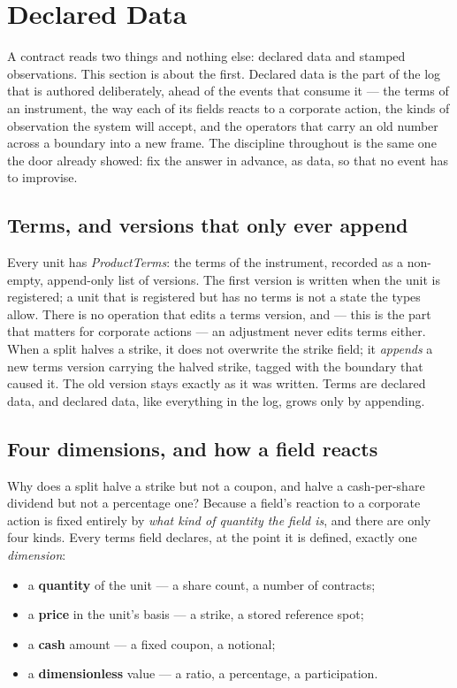 \section{Declared Data}\label{sec:data}

A contract reads two things and nothing else: declared data and stamped
observations. This section is about the first. Declared data is the part of the
log that is authored deliberately, ahead of the events that consume it --- the
terms of an instrument, the way each of its fields reacts to a corporate action,
the kinds of observation the system will accept, and the operators that carry an
old number across a boundary into a new frame. The discipline throughout is the
same one the door already showed: fix the answer in advance, as data, so that no
event has to improvise.

\subsection{Terms, and versions that only ever append}

Every unit has \emph{ProductTerms}: the terms of the instrument, recorded as a
non-empty, append-only list of versions. The first version is written when the
unit is registered; a unit that is registered but has no terms is not a state the
types allow. There is no operation that edits a terms version, and --- this is the
part that matters for corporate actions --- an adjustment never edits terms
either. When a split halves a strike, it does not overwrite the strike field; it
\emph{appends} a new terms version carrying the halved strike, tagged with the
boundary that caused it. The old version stays exactly as it was written. Terms
are declared data, and declared data, like everything in the log, grows only by
appending.

\subsection{Four dimensions, and how a field reacts}

Why does a split halve a strike but not a coupon, and halve a cash-per-share
dividend but not a percentage one? Because a field's reaction to a corporate
action is fixed entirely by \emph{what kind of quantity the field is}, and there
are only four kinds. Every terms field declares, at the point it is defined,
exactly one \emph{dimension}:

\begin{itemize}[leftmargin=1.5em]
\item a \textbf{quantity} of the unit --- a share count, a number of contracts;
\item a \textbf{price} in the unit's basis --- a strike, a stored reference spot;
\item a \textbf{cash} amount --- a fixed coupon, a notional;
\item a \textbf{dimensionless} value --- a ratio, a percentage, a participation.
\end{itemize}

